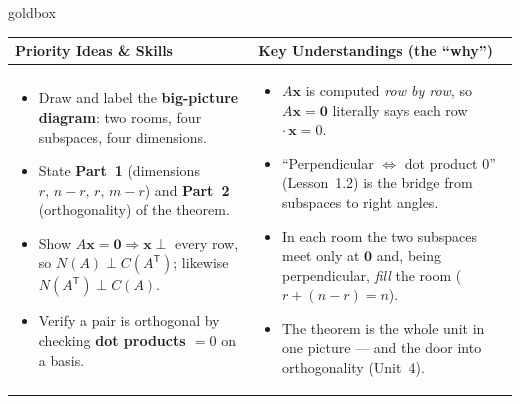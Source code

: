 \documentclass[10pt]{article}
\newcommand{\xx}{\mathbf{x}}
\newcommand{\zero}{\mathbf{0}}
\newcommand{\T}{\mathsf{T}}
\begin{document}
\renewcommand{\arraystretch}{1.4}
\begin{skillbox}{goldbox}
\begin{tabularx}{\linewidth}{@{}X|X@{}}
\textbf{Priority Ideas \& Skills} & \textbf{Key Understandings (the ``why'')} \\[2pt]
\hline
\vspace{-6pt}
\begin{itemize}[leftmargin=1.1em, nosep, after=\vspace{2pt}]
  \item Draw and label the \textbf{big-picture diagram}: two rooms, four subspaces, four dimensions.
  \item State \textbf{Part~1} (dimensions $r,\,n-r,\,r,\,m-r$) and \textbf{Part~2} (orthogonality) of the theorem.
  \item Show $A\xx=\zero \Rightarrow \xx\perp$ every row, so $N(A)\perp C(A^{\T})$; likewise $N(A^{\T})\perp C(A)$.
  \item Verify a pair is orthogonal by checking \textbf{dot products $=0$} on a basis.
\end{itemize}
&
\vspace{-6pt}
\begin{itemize}[leftmargin=1.1em, nosep, after=\vspace{2pt}]
  \item $A\xx$ is computed \emph{row by row}, so $A\xx=\zero$ literally says each row $\cdot\,\xx=0$.
  \item ``Perpendicular $\Leftrightarrow$ dot product $0$'' (Lesson~1.2) is the bridge from subspaces to right angles.
  \item In each room the two subspaces meet only at $\zero$ and, being perpendicular, \emph{fill} the room ($r+(n-r)=n$).
  \item The theorem is the whole unit in one picture --- and the door into orthogonality (Unit~4).
\end{itemize}
\end{tabularx}
\end{skillbox}
\end{document}
